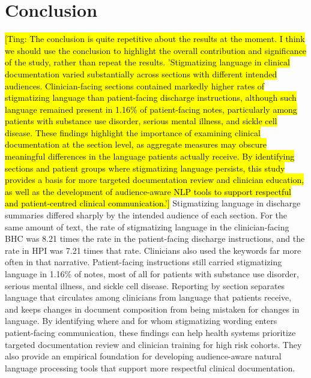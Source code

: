 \documentclass[unnumsec,webpdf,contemporary,large]{oup-authoring-template}
\newcommand{\td}[1]{\sethlcolor{pink}\hl{[Ting: #1]}}
\begin{document}

\section{Conclusion}
\td{The conclusion is quite repetitive about the results at the moment.  I think we should use the conclusion to highlight the overall contribution and significance of the study, rather than repeat the results. 'Stigmatizing language in clinical documentation varied substantially across sections with different intended audiences. Clinician-facing sections contained markedly higher rates of stigmatizing language than patient-facing discharge instructions, although such language remained present in 1.16\% of patient-facing notes, particularly among patients with substance use disorder, serious mental illness, and sickle cell disease. These findings highlight the importance of examining clinical documentation at the section level, as aggregate measures may obscure meaningful differences in the language patients actually receive. By identifying sections and patient groups where stigmatizing language persists, this study provides a basis for more targeted documentation review and clinician education, as well as the development of audience-aware NLP tools to support respectful and patient-centred clinical communication.'}
Stigmatizing language in discharge summaries differed sharply by the intended audience of each section. For the same amount of text, the rate of stigmatizing language in the clinician-facing BHC was 8.21 times the rate in the patient-facing discharge instructions, and the rate in HPI was 7.21 times that rate. Clinicians also used the keywords far more often in that narrative. Patient-facing instructions still carried stigmatizing language in 1.16\% of notes, most of all for patients with substance use disorder, serious mental illness, and sickle cell disease. Reporting by section separates language that circulates among clinicians from language that patients receive, and keeps changes in document composition from being mistaken for changes in language. %
By identifying where and for whom stigmatizing wording enters patient-facing communication, these findings can help health systems prioritize targeted documentation review and clinician training for high risk cohorts. They also provide an empirical foundation for developing audience-aware natural language processing tools that support more respectful clinical documentation.
\end{document}
